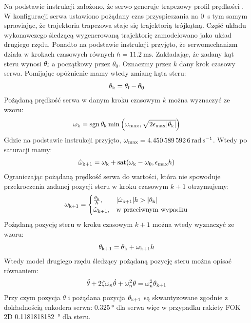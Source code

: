 Na podstawie instrukcji \cite{HerkuleX} założono, że serwo generuje trapezowy profil prędkości \cite{biagiotti2008trajectory}.
W konfiguracji serwa ustawiono pożądany czas przyspieszania na \SI{0}{\s} tym samym sprawiając,
że trajektoria trapezowa staje się trajektorią trójkątną. Część układu wykonawczego śledzącą wygenerowaną 
trajektorię zamodelowano jako układ drugiego rzędu. 
Ponadto na podstawie instrukcji \cite{HerkuleX} przyjęto, że serwomechanizm
działa w krokach czasowych równych \(h = \SI{11.2}{\milli\s}\). 
Zakładając, że zadany kąt steru wynosi \(\theta_\textnormal{f}\) a początkowy przez \(\theta_0\).
Oznaczmy przez \(k\) dany krok czasowy serwa. Pomijając opóżnienie mamy wtedy zmianę kąta steru:
\begin{equation}
    \theta_\textnormal{k} = \theta_\textnormal{f} - \theta_\textnormal{0}
    \label{eq:badania-servo-angle-change}
\end{equation}
Pożądaną prędkość serwa w danym kroku czasowym \(k\) można wyznaczyć ze wzoru:
\begin{equation}
    \omega_\textnormal{k} = \operatorname{sgn}{\theta_\textnormal{k}} \min\left(\omega_\textnormal{max}, \sqrt{2 \epsilon_\textnormal{max} |\theta_\textnormal{k}|}\right)
    \label{eq:badania-servo-speed}
\end{equation}
Gdzie na podstawie instrukcji \cite{HerkuleX} przyjęto, \(\omega_\tn{max} = \SI{4.4505895926}{\radian\per\s}\).
Wtedy po saturacji mamy:
\begin{equation}
    \hat{\omega}_\textnormal{k+1} = \omega_\textnormal{k} + \operatorname{sat}(\omega_\textnormal{k} - \omega_0, \epsilon_\textnormal{max} h)
    \label{eq:badania-servo-speed-saturation}
\end{equation}
Ograniczając pożądaną prędkość serwa do wartości, która nie spowoduje przekroczenia zadanej pozycji steru w kroku czasowym \(k+1\) otrzymujemy:
\begin{equation}
    \omega_\textnormal{k+1} = 
    \begin{cases}
        \frac{\theta_\textnormal{k}}{h}, & |\hat{\omega}_\textnormal{k+1}| h > |\theta_\textnormal{k}| \\
        \hat{\omega}_\textnormal{k+1}, & \text{w przeciwnym wypadku}
    \end{cases}
    \label{eq:badania-servo-speed-limit}
\end{equation}
Pożądaną pozycję steru w kroku czasowym \(k+1\) można wtedy wyznaczyć ze wzoru:
\begin{equation}
    \theta_\textnormal{k+1} = \theta_\textnormal{k} + \omega_\textnormal{k+1} h
    \label{eq:badania-servo-position}
\end{equation}
Wtedy model drugiego rzędu śledzący pożądaną pozycję steru można opisać równaniem:
\begin{equation}
    \ddot{\theta} + 2 \zeta \omega_n \dot{\theta} + \omega_n^2 \theta = \omega_n^2 \theta_\textnormal{k+1}
    \label{eq:badania-servo-second-order}
\end{equation}
Przy czym pozycja \(\theta\) i pożądana pozycja \(\theta_\textnormal{k+1}\) są skwantyzowane
zgodnie z dokładnością enkodera serwa: \(\SI{0.325}{\degree}\) dla serwa więc w przypadku rakiety FOK 2D \SI{0.1181818182}{\degree}
dla steru.

